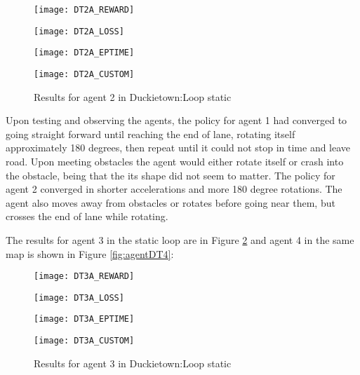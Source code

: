 \documentclass[journal]{IEEEtran}
\begin{document}
		\begin{figure}[hbt!]
			\centering
			
			\begin{minipage}[b]{4cm}
  				\texttt{[image: DT2A\_REWARD]}
 			\end{minipage}
			\quad
			\begin{minipage}[b]{4cm}
  				\texttt{[image: DT2A\_LOSS]}
			\end{minipage}
			\quad
			\begin{minipage}[b]{4cm}
  				\texttt{[image: DT2A\_EPTIME]}
 			\end{minipage}
			\quad
			\begin{minipage}[b]{4cm}
  				\texttt{[image: DT2A\_CUSTOM]}
			\end{minipage}
			
			\caption{Results for agent 2 in Duckietown:Loop static}
  			\label{fig:agentDT2}
		\end{figure}
		
		Upon testing and observing the agents, the policy for agent 1 had converged to going straight forward until reaching the end of lane, rotating itself approximately 180 degrees, then repeat until it could not stop in time and leave road. Upon meeting obstacles the agent would either rotate itself or crash into the obstacle, being that the its shape did not seem to matter. The policy for agent 2 converged in shorter accelerations and more 180 degree rotations. The agent also moves away from obstacles or rotates before going near them, but crosses the end of lane while rotating.
		
		The results for agent 3 in the static loop are in Figure \ref{fig:agentDT3} and agent 4 in the same map is shown in Figure \ref{fig:agentDT4}:
		
		\begin{figure}[hbt!]
			\centering
			
			\begin{minipage}[b]{4cm}
  				\texttt{[image: DT3A\_REWARD]}
 			\end{minipage}
			\quad
			\begin{minipage}[b]{4cm}
  				\texttt{[image: DT3A\_LOSS]}
			\end{minipage}
			\quad
			\begin{minipage}[b]{4cm}
  				\texttt{[image: DT3A\_EPTIME]}
 			\end{minipage}
			\quad
			\begin{minipage}[b]{4cm}
  				\texttt{[image: DT3A\_CUSTOM]}
			\end{minipage}
			
			\caption{Results for agent 3 in Duckietown:Loop static}
  			\label{fig:agentDT3}
		\end{figure}
		
\end{document}
